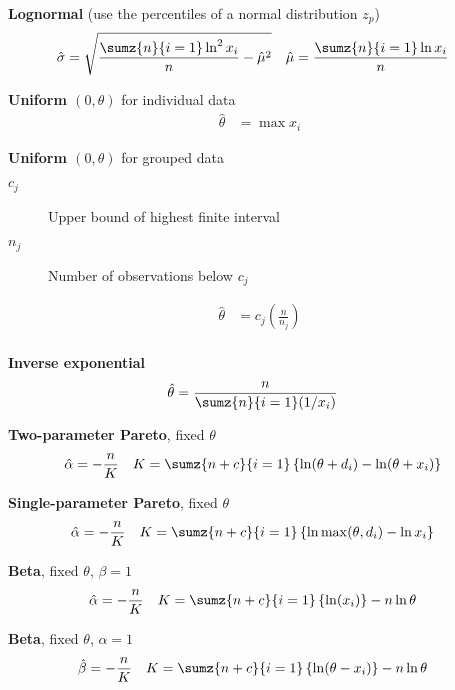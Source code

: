 \documentclass[10pt, french]{article}\usepackage[]{graphicx}\usepackage[]{color}
\begin{document}
\begin{multicols*}{2}
\textbf{Lognormal} (use the percentiles of a normal distribution $z_{p}$)
\begin{align*}
	\hat{\sigma}
	&=	\sqrt{\frac{\sumz{n}{i = 1}\ln^{2} x_{i}}{n} - \hat{\mu}^{2}}	&
	\hat{\mu}
	&=	\frac{\sumz{n}{i = 1}\ln x_{i}}{n}
\end{align*}

\textbf{Uniform $(0, \theta)$} for individual data
\begin{align*}
	\hat{\theta}
	&=	\max x_{i}
\end{align*}

\textbf{Uniform $(0, \theta)$} for grouped data
\begin{description}
	\item[$c_{j}$]	Upper bound of highest finite interval
	\item[$n_{j}$]	Number of observations below $c_{j}$
\end{description}
\begin{align*}
	\hat{\theta}
	&=	c_{j} \left(\frac{n}{n_{j}}\right)	\\
\end{align*}

\textbf{Inverse exponential}
\begin{align*}
	\hat{\theta}
	&=	\frac{n}{\sumz{n}{i = 1}(1/x_{i})}
\end{align*}

\textbf{Two-parameter Pareto}, fixed $\theta$
\begin{align*}
	\hat{\alpha}
	&=	-\frac{n}{K}	&
	K
	&=	\sumz{n + c}{i	=	1} \left\{\ln (\theta +  d_{i})	-	\ln (\theta + x_{i})\right\}
\end{align*}

\textbf{Single-parameter Pareto}, fixed $\theta$
\begin{align*}
	\hat{\alpha}
	&=	-\frac{n}{K}	&
	K
	&=	\sumz{n + c}{i	=	1} \left\{\ln \max(\theta, d_{i})	-	\ln x_{i}\right\}
\end{align*}

\textbf{Beta}, fixed $\theta$, $\beta	=	1$
\begin{align*}
	\hat{\alpha}
	&=	-\frac{n}{K}	&
	K
	&=	\sumz{n + c}{i	=	1} \left\{\ln (x_{i})\right\}	-	n\ln \theta
\end{align*}

\textbf{Beta}, fixed $\theta$, $\alpha	=	1$
\begin{align*}
	\hat{\beta}
	&=	-\frac{n}{K}	&
	K
	&=	\sumz{n + c}{i	=	1} \left\{\ln (\theta - x_{i})\right\}	-	n\ln \theta
\end{align*}


\end{multicols*}
\end{document}
